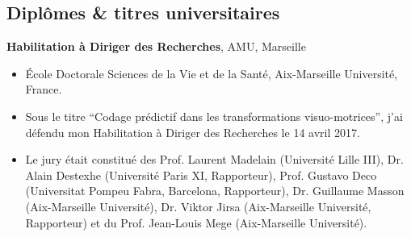 \documentclass[10pt,french,a4paper,oneside]{article}%
\newcommand{\years}[1]{\marginpar{\textit{\scriptsize #1}}}
\begin{document}
\subsection{Diplômes \& titres universitaires}

\textbf{Habilitation à Diriger des Recherches}, AMU, Marseille\hfill \years{\textbf{2017}}\\
\vspace*{-.15in}
\begin{itemize}
\item[] \'Ecole Doctorale Sciences de la Vie et de la Santé, Aix-Marseille Université, France.
\item[] Sous le titre ``Codage prédictif dans les transformations visuo-motrices'', j'ai défendu mon Habilitation à Diriger des Recherches le 14 avril 2017.
\item[] Le jury était constitué des Prof. Laurent Madelain (Université Lille III), Dr. Alain Destexhe (Université Paris XI, Rapporteur), Prof. Gustavo Deco (Universitat Pompeu Fabra, Barcelona, Rapporteur), Dr. Guillaume Masson (Aix-Marseille Université), Dr. Viktor Jirsa (Aix-Marseille Université, Rapporteur) et du Prof. Jean-Louis Mege (Aix-Marseille Université).
\end{itemize} %
\end{document}
